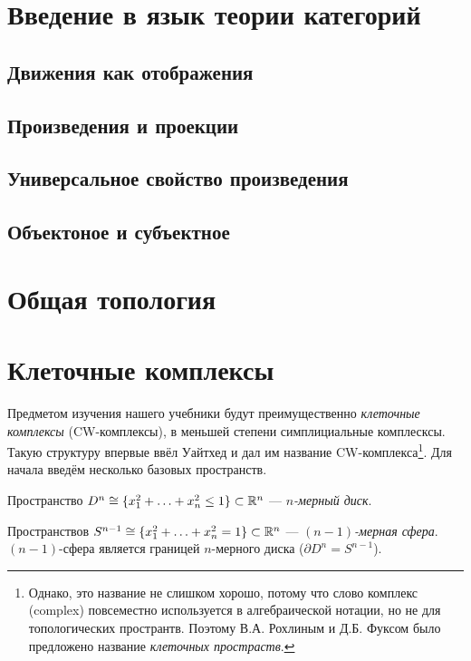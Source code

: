 \documentclass[10pt, twoside]{article}
\begin{document}
\pagestyle{empty}


\newpage

\tableofcontents
\newpage

\setcounter{page}{1}
\pagestyle{fancy}

\section{Введение в язык теории категорий} %
\subsection{Движения как отображения} %
\subsection{Произведения и проекции}
\subsection{Универсальное свойство произведения}
\subsection{Объектоное и субъектное}

\section{Общая топология}

\section{Клеточные комплексы}
Предметом изучения нашего учебники будут преимущественно \emph{клеточные комплексы} (CW-комплексы), в меньшей степени симплициальные комплесксы. Такую структуру впервые ввёл Уайтхед и дал им название CW-комплекса\footnote{Однако, это название не слишком хорошо, потому что слово комплекс (complex) повсеместно используется в алгебраической нотации, но не для топологических пространтв. Поэтому В.А. Рохлиным и Д.Б. Фуксом было предложено название \emph{клеточных простраств}.}.  %
Для начала введём несколько базовых пространств.

\begin{definition}
    Пространство $D^n \cong \{x_1^2 + \ldots + x_n^2 \leq 1\} \subset \mathbb R^n$ --- \emph{$n$-мерный диск}. 
\end{definition}
\begin{definition}
    Пространствов $S^{n-1} \cong \{x_1^2 + \ldots + x_n^2 = 1\} \subset \mathbb R^n$ --- \emph{$(n-1)$-мерная сфера}.
    $(n-1)$-сфера является границей $n$-мерного диска ($\partial D^n = S^{n-1}$).
\end{definition}
\end{document}
